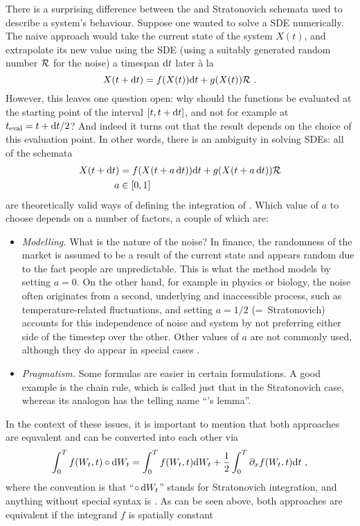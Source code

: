 There is a surprising difference between the \Ito{} and Stratonovich schemata used to describe a system's behaviour. Suppose one wanted to solve a SDE numerically. The naive approach would take the current state of the system \(X(t)\), and extrapolate its new value using the SDE (using a suitably generated random number \(\mathcal{R}\) for the noise) a timespan \(\mathrm{d} t\) later \`a la
%
\begin{equation}
	X(t+\mathrm{d} t) = f(X(t))\mathrm{d} t + g(X(t)) \mathcal{R} ~.
\end{equation}
%
However, this leaves one question open: why should the functions be evaluated at the starting point of the interval \([t,t+\mathrm{d} t]\), and not for example at \(t_\text{eval} = t+\mathrm{d} t/2\)? And indeed it turns out that the result depends on the choice of this evaluation point. In other words, there is an ambiguity in solving SDEs: all of the schemata
%
\begin{align}
	X(t+\mathrm{d} t) &= f(X(t+a\,\mathrm{d} t))\mathrm{d} t + g(X(t+a\,\mathrm{d} t)) \mathcal{R} \\
	a &\in [0,1]
\end{align}
%
are theoretically valid ways of defining the integration of . Which value of \(a\) to choose depends on a number of factors, a couple of which are:
%
\begin{itemize}
	\item \emph{Modelling.} What is the nature of the noise? In finance, the randomness of the market is assumed to be a result of the current state and appears random due to the fact people are unpredictable. This is what the \Ito{} method models by setting \(a = 0\). On the other hand, for example in physics or biology, the noise often originates from a second, underlying and inaccessible process, such as temperature-related fluctuations, and setting \(a = 1/2\) (=~Stratonovich) accounts for this independence of noise and system by not preferring either side of the timestep over the other. Other values of \(a\) are not commonly used, although they do appear in special cases .
	\item \emph{Pragmatism.} Some formulas are easier in certain formulations. A good example is the chain rule, which is called just that in the Stratonovich case, whereas its analogon has the telling name ``\Ito{}'s lemma''.
\end{itemize}
%
In the context of these issues, it is important to mention that both approaches are equvalent and can be converted into each other via
%
\begin{equation}
	\int_0^Tf(W_t,t)\circ\mathrm{d} W_t
	=
	\int_0^Tf(W_t,t)\mathrm{d} W_t
	+
	\frac12\int_0^T \partial_xf(W_t,t)\mathrm{d} t ~,
\end{equation}
%
where the convention is that ``\(\circ\,\mathrm{d} W_t\)'' stands for Stratonovich integration, and anything without special syntax is \Ito{}. As can be seen above, both approaches are equivalent if the integrand \(f\) is spatially constant


